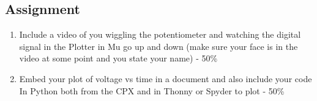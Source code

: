 \subsection{Assignment}



\begin{enumerate}[itemsep=-5pt]
\item Include a video of you wiggling the potentiometer and watching the digital signal in the Plotter in Mu go up and down (make sure your face is in the video at some point and you state your name) - 50\%
\item Embed your plot of voltage vs time in a document and also include your code In Python both from the CPX and in Thonny or Spyder to plot - 50\%
\end{enumerate}
